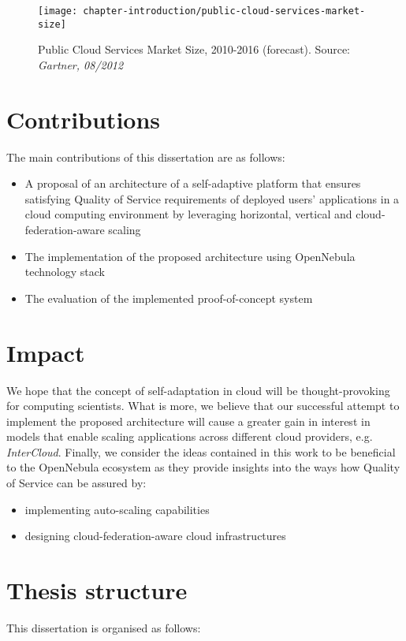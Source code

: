 \begin{figure}[!ht]
  \begin{center}
    \texttt{[image: chapter-introduction/public-cloud-services-market-size]}
  \end{center}
  \caption{Public Cloud Services Market Size, 2010-2016 (forecast). Source: \textit{Gartner, 08/2012}}
  \label{chapter-fig:public-cloud-services-market-size}
\end{figure}

\section{Contributions}
The main contributions of this dissertation are as follows:
\begin{itemize}
  \item A proposal of an architecture of a self-adaptive platform that ensures satisfying Quality of Service requirements of deployed users' applications in a cloud computing environment by leveraging horizontal, vertical and cloud-federation-aware scaling
  \item The implementation of the proposed architecture using OpenNebula technology stack
  \item The evaluation of the implemented proof-of-concept system
\end{itemize}

\section{Impact}
We hope that the concept of self-adaptation in cloud will be thought-provoking for computing scientists.  What is more, we believe that our successful attempt to implement the proposed architecture will cause a greater gain in interest in models that enable scaling applications across different cloud providers, e.g. \emph{InterCloud}.
Finally, we consider the ideas contained in this work to be beneficial to the OpenNebula ecosystem as they provide insights into the ways how Quality of Service can be assured by:

\begin{itemize}
  \item implementing auto-scaling capabilities
  \item designing cloud-federation-aware cloud infrastructures
\end{itemize}

\section{Thesis structure}
This dissertation is organised as follows:

